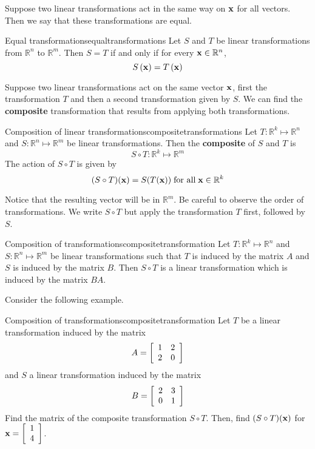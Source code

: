 Suppose two linear transformations act in the same way on ${\bf x}$ for all vectors. Then we say that these transformations are equal.

\begin{definition}{Equal transformations}{equaltransformations}
Let $S$ and $T$ be linear transformations from $\mathbb{R}^n$ to $\mathbb{R}^m$. Then $S = T$ if and only if for every ${\bf x} \in \mathbb{R}^n$, 
\[
S \left( {\bf x} \right) = T \left( {\bf x} \right)
\]
\end{definition}

Suppose two linear transformations act on the same vector ${\bf x}$, first the transformation $T$ and then a second transformation given by $S$. We can find the \textbf{composite} transformation that results from applying both transformations.

\begin{definition}{Composition of linear transformations}{compositetransformations}
Let $T: \mathbb{R}^k \mapsto \mathbb{R}^n$ and $S: \mathbb{R}^n \mapsto \mathbb{R}^m$ be linear transformations. Then the \textbf{composite} of $S$ and $T$ is 
\[
S \circ T: \mathbb{R}^k \mapsto \mathbb{R}^m
\]
The action of $S \circ T$ is given by 
\[
(S \circ T) ({\bf x}) = S(T({\bf x})) \; \mbox{for all} \; {\bf x} \in \mathbb{R}^k
\]
\end{definition}

Notice that the resulting vector will be in $\mathbb{R}^m$. Be careful to observe the order of transformations. We write $S \circ T$ but apply the transformation $T$ first, followed by $S$. 

\begin{theorem}{Composition of transformations}{compositetransformation}
Let $T: \mathbb{R}^k \mapsto \mathbb{R}^n$ and $S: \mathbb{R}^n \mapsto \mathbb{R}^m$ be linear transformations such that $T$ is induced by the matrix $A$ and $S$ is induced by the matrix $B$. Then $S \circ T$ is a linear transformation which is induced by the matrix $BA$.
\end{theorem}

Consider the following example. 

\begin{example}{Composition of transformations}{compositetransformation}
Let $T$ be a linear transformation induced by the matrix 
\[
A = 
\left[
\begin{array}{rr}
1 & 2 \\
2 & 0 
\end{array}
\right]
\]
and $S$ a linear transformation induced by the matrix
\[
B = 
\left[
\begin{array}{rr}
2 & 3 \\
0 & 1
\end{array}
\right]
\]
Find the matrix of the composite transformation $S \circ T$. Then, find $(S \circ T)({\bf x})$ for ${\bf x} = \left[
\begin{array}{r}
1 \\
4 
\end{array}
\right]$.
\end{example}


